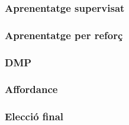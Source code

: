 \documentclass[12pt,a4paper,final,twoside]{article}
\begin{document}


\subsubsection{Aprenentatge supervisat}
\subsubsection{Aprenentatge per reforç}

\subsubsection{DMP}

\subsubsection{Affordance}

\subsubsection{Elecció final}
\end{document}

